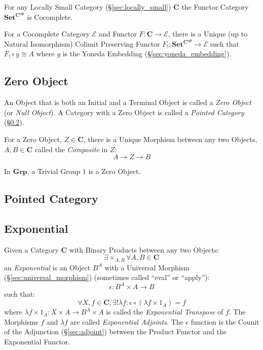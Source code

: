 For any Locally Small Category (\S\ref{sec:locally_small})
$\mathbf{C}$ the Functor Category $\mathbf{Set^{C^{op}}}$ is
Cocomplete.

For a Cocomplete Category $\mathcal{E}$ and Functor $F : \mathbf{C}
\rightarrow \mathcal{E}$, there is a Unique (up to Natural
Isomorphism) Colimit Preserving Functor $F_! : \mathbf{Set^{C^{op}}}
\rightarrow \mathcal{E}$ such that $F_! \circ y \cong A$ where $y$ is
the Yoneda Embedding (\S\ref{sec:yoneda_embedding}).\cite{awodey06}



\subsection{Zero Object}\label{sec:zero_object}

An Object that is both an Initial and a Terminal Object is called a
\emph{Zero Object} (or \emph{Null Object}). A Category with a Zero
Object is called a \emph{Pointed Category}
(\S\ref{sec:pointed_category}).

For a Zero Object, $Z \in \mathbf{C}$, there is a Unique Morphism
between any two Objects, $A, B \in \mathbf{C}$ called the
\emph{Composite} in $Z$:
\[
  A \rightarrow Z \rightarrow B
\]

In $\mathbf{Grp}$, a Trivial Group ${1}$ is a Zero Object.



\subsection{Pointed Category}\label{sec:pointed_category}



\subsection{Exponential}\label{sec:category_exponential}

Given a Category $\mathbf{C}$ with Binary Products between any two
Objects:
\[
  \exists \times_{A,B} \forall A,B \in \mathbf{C}
\]
an \emph{Exponential} is an Object $B^A$ with a Universal Morphism
(\S\ref{sec:universal_morphism}) (sometimes called ``eval'' or
``apply''):
\[
  \epsilon : B^A \times A \rightarrow B
\]
such that:
\[
  \forall X, f \in \mathbf{C}, \exists ! \lambda f :
  \epsilon \circ (\lambda f \times 1_A) = f
\]
where $\lambda f \times 1_A : X \times A \rightarrow B^A \times A$ is
called the \emph{Exponential Transpose} of $f$. The Morphisms $f$ and
$\lambda f$ are called \emph{Exponential Adjoints}. The $\epsilon$
function is the Counit of the Adjunction (\S\ref{sec:adjoint}) between
the Product Functor and the Exponential Functor.


